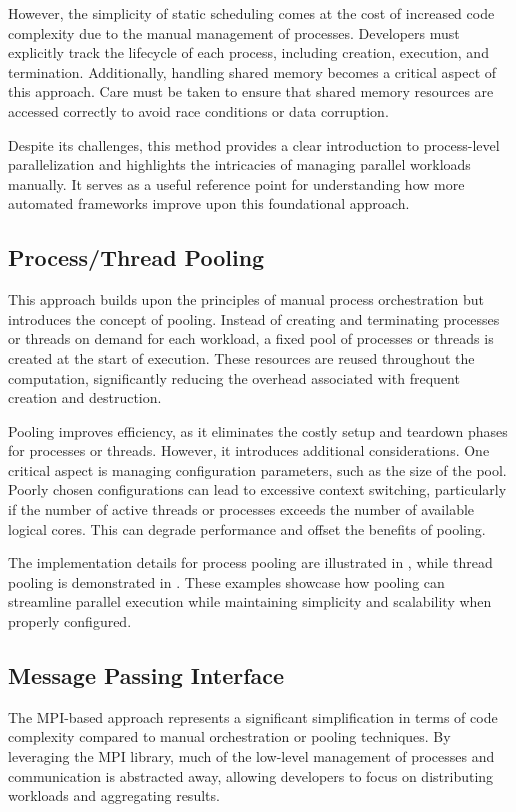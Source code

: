 \documentclass[a4paper, oneside]{article}
\begin{document}
However, the simplicity of static scheduling comes at the cost of increased code complexity due to the manual management of processes. Developers must explicitly track the lifecycle of each process, including creation, execution, and termination. Additionally, handling shared memory becomes a critical aspect of this approach. Care must be taken to ensure that shared memory resources are accessed correctly to avoid race conditions or data corruption.

Despite its challenges, this method provides a clear introduction to process-level parallelization and highlights the intricacies of managing parallel workloads manually. It serves as a useful reference point for understanding how more automated frameworks improve upon this foundational approach.

\subsection{Process/Thread Pooling}
This approach builds upon the principles of manual process orchestration but introduces the concept of pooling. Instead of creating and terminating processes or threads on demand for each workload, a fixed pool of processes or threads is created at the start of execution. These resources are reused throughout the computation, significantly reducing the overhead associated with frequent creation and destruction.

Pooling improves efficiency, as it eliminates the costly setup and teardown phases for processes or threads. However, it introduces additional considerations. One critical aspect is managing configuration parameters, such as the size of the pool. Poorly chosen configurations can lead to excessive context switching, particularly if the number of active threads or processes exceeds the number of available logical cores. This can degrade performance and offset the benefits of pooling.

The implementation details for process pooling are illustrated in , while thread pooling is demonstrated in . These examples showcase how pooling can streamline parallel execution while maintaining simplicity and scalability when properly configured.

\subsection{Message Passing Interface}
The MPI-based approach represents a significant simplification in terms of code complexity compared to manual orchestration or pooling techniques. By leveraging the MPI library, much of the low-level management of processes and communication is abstracted away, allowing developers to focus on distributing workloads and aggregating results.
\end{document}
